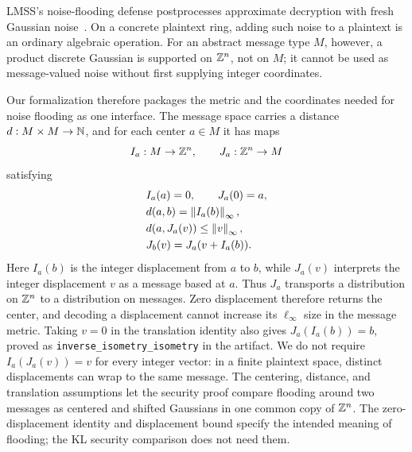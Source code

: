 LMSS's noise-flooding defense postprocesses approximate decryption with fresh
Gaussian noise~\cite{lmss}.
On a concrete plaintext ring, adding such noise to a plaintext is an ordinary
algebraic operation.
For an abstract message type \(M\), however, a product discrete Gaussian is
supported on \(\mathbb{Z}^n\), not on \(M\); it cannot be used as message-valued
noise without first supplying integer coordinates.

Our formalization therefore packages the metric and the coordinates needed
for noise flooding as one interface.
The message space carries a distance \(d:M\times M\to\mathbb{N}\), and for each
center \(a\in M\) it has maps
\[
 I_a:M\rightarrow\mathbb{Z}^n,
 \qquad J_a:\mathbb{Z}^n\rightarrow M
\]
satisfying
\begin{equation}
\label{eq:charts}
 \begin{aligned}
 &I_a(a)=0,\qquad J_a(0)=a,\\
 &d(a,b)=\left\lVert I_a(b)\right\rVert_\infty,\\
 &d(a,J_a(v))\leq\left\lVert v\right\rVert_\infty,\\
 &J_b(v)=J_a(v+I_a(b)).
 \end{aligned}
\end{equation}
Here \(I_a(b)\) is the integer displacement from \(a\) to \(b\), while
\(J_a(v)\) interprets the integer displacement \(v\) as a message based at
\(a\).
Thus \(J_a\) transports a distribution on \(\mathbb{Z}^n\) to a distribution on
messages.
Zero displacement therefore returns the center, and decoding a displacement
cannot increase its \(\ell_\infty\) size in the message metric.
Taking \(v=0\) in the translation identity also gives
\(J_a(I_a(b))=b\), proved as \nolinkurl{inverse_isometry_isometry} in the
artifact.
We do not require \(I_a(J_a(v))=v\) for every integer vector: in a finite
plaintext space, distinct displacements can wrap to the same message.
The centering, distance, and translation assumptions let the security proof compare
flooding around two messages as centered and shifted Gaussians in one common
copy of \(\mathbb{Z}^n\).
The zero-displacement identity and displacement bound specify the intended
meaning of flooding; the KL security comparison does not need them.


